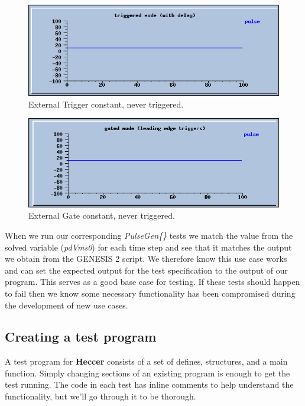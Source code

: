 \documentclass[12pt]{article}
\begin{document}
\begin{figure}[ht]
  \centering
    \includegraphics[scale=0.4]{figures/pulse1.png}
  \caption{External Trigger constant, never triggered.}
\end{figure}

\begin{figure}[ht]
  \centering
    \includegraphics[scale=0.4]{figures/pulse2.png}
  \caption{External Gate constant, never triggered.}
\end{figure}

When we run our corresponding {\it PulseGen\{\}} tests we match the value from the solved variable ({\it pdVms0}) for each time step and see that it matches the output we obtain from the GENESIS 2 script. We therefore know this use case works and can set the expected output for the test specification to the output of our program. This serves as a good base case for testing. If these tests should happen to fail then we know some necessary functionality has been compromised during the development of new use cases.

\subsection*{Creating a test program}

A test program for {\bf Heccer} consists of a set of defines, structures, and a main function. Simply changing sections of an existing program is enough to get the test running. The code in each test has inline comments to help understand the functionality, but we'll go through it to be thorough.
\end{document}
